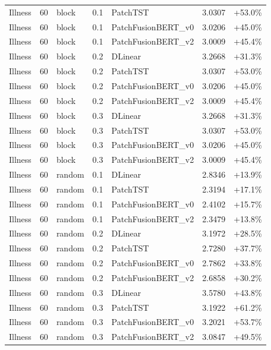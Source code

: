 \begin{tabular}{lllrlll}
Illness & 60 & block & 0.1 & PatchTST & 3.0307 & +53.0\% \\
Illness & 60 & block & 0.1 & PatchFusionBERT_v0 & 3.0206 & +45.0\% \\
Illness & 60 & block & 0.1 & PatchFusionBERT_v2 & 3.0009 & +45.4\% \\
Illness & 60 & block & 0.2 & DLinear & 3.2668 & +31.3\% \\
Illness & 60 & block & 0.2 & PatchTST & 3.0307 & +53.0\% \\
Illness & 60 & block & 0.2 & PatchFusionBERT_v0 & 3.0206 & +45.0\% \\
Illness & 60 & block & 0.2 & PatchFusionBERT_v2 & 3.0009 & +45.4\% \\
Illness & 60 & block & 0.3 & DLinear & 3.2668 & +31.3\% \\
Illness & 60 & block & 0.3 & PatchTST & 3.0307 & +53.0\% \\
Illness & 60 & block & 0.3 & PatchFusionBERT_v0 & 3.0206 & +45.0\% \\
Illness & 60 & block & 0.3 & PatchFusionBERT_v2 & 3.0009 & +45.4\% \\
Illness & 60 & random & 0.1 & DLinear & 2.8346 & +13.9\% \\
Illness & 60 & random & 0.1 & PatchTST & 2.3194 & +17.1\% \\
Illness & 60 & random & 0.1 & PatchFusionBERT_v0 & 2.4102 & +15.7\% \\
Illness & 60 & random & 0.1 & PatchFusionBERT_v2 & 2.3479 & +13.8\% \\
Illness & 60 & random & 0.2 & DLinear & 3.1972 & +28.5\% \\
Illness & 60 & random & 0.2 & PatchTST & 2.7280 & +37.7\% \\
Illness & 60 & random & 0.2 & PatchFusionBERT_v0 & 2.7862 & +33.8\% \\
Illness & 60 & random & 0.2 & PatchFusionBERT_v2 & 2.6858 & +30.2\% \\
Illness & 60 & random & 0.3 & DLinear & 3.5780 & +43.8\% \\
Illness & 60 & random & 0.3 & PatchTST & 3.1922 & +61.2\% \\
Illness & 60 & random & 0.3 & PatchFusionBERT_v0 & 3.2021 & +53.7\% \\
Illness & 60 & random & 0.3 & PatchFusionBERT_v2 & 3.0847 & +49.5\% \\
\bottomrule
\end{tabular}
